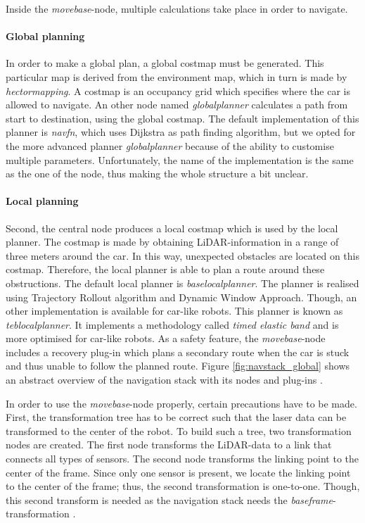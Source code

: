 \documentclass[conference,a4paper]{IEEEtran}
\begin{document}
Inside the \textit{move\textunderscore base}-node, multiple calculations take place in order to navigate. 
\paragraph{Global planning}
In order to make a global plan, a global costmap must be generated. This particular map is derived from the environment map, which in turn is made by \emph{hector\textunderscore mapping}. A costmap is an occupancy grid which specifies where the car is allowed to navigate. An other node named \emph{global\textunderscore planner} calculates a path from start to destination, using the global costmap. The default implementation of this planner is \emph{navfn}, which uses Dijkstra as path finding algorithm, but we opted for the more advanced planner \emph{global\textunderscore planner} because of the ability to customise multiple parameters. Unfortunately, the name of the implementation is the same as the one of the node, thus making the whole structure a bit unclear. 
\paragraph{Local planning}
Second, the central node produces a local costmap which is used by the local planner. The costmap is made by obtaining LiDAR-information in a range of three meters around the car. In this way, unexpected obstacles are located on this costmap. Therefore, the local planner is able to plan a route around these obstructions. The default local planner is \emph{base\textunderscore local\textunderscore planner}\cite{Marder-Eppstein2017_2}. The planner is realised using Trajectory Rollout algorithm and Dynamic Window Approach\cite{Fox1997, Gerkey2008}. 
Though, an other implementation is available for car-like robots. This planner is known as \emph{teb\textunderscore local\textunderscore planner}\cite{Rosmann2016}. It implements a methodology called \emph{timed elastic band} and is more optimised for car-like robots. As a safety feature, the \emph{move\textunderscore base}-node includes a recovery plug-in which plans a secondary route when the car is stuck and thus unable to follow the planned route.
Figure \ref{fig:navstack_global} shows an abstract overview of the navigation stack with its nodes and plug-ins \cite{Marder-Eppstein2016_2, Zheng2016}.


In order to use the \emph{move\textunderscore base}-node properly, certain precautions have to be made. First, the transformation tree has to be correct such that the laser data can be transformed to the center of the robot. To build such a tree, two transformation nodes are created. The first node transforms the LiDAR-data to a link that connects all types of sensors. The second node transforms the linking point to the center of the frame. Since only one sensor is present, we locate the linking point to the center of the frame; thus, the second transformation is one-to-one. Though, this second transform is needed as the navigation stack needs the \emph{base\textunderscore frame}-transformation \cite{Kohlbrecher2012_tf} \cite{Woodall2015}.
\end{document}
